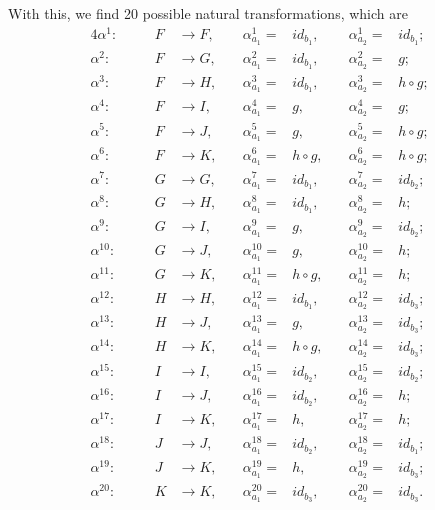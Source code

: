 \documentclass[12pt]{article}
\begin{document}
With this, we find 20 possible natural transformations, which are
\begin{alignat*}{4}
    \alpha^1: &\quad& F&\rightarrow F, \quad& \alpha^1_{a_1}= &id_{b_1}, \quad& \alpha^1_{a_2}= &id_{b_1} ; \\
    \alpha^2: &\quad& F&\rightarrow G, \quad& \alpha^2_{a_1}= &id_{b_1}, \quad& \alpha^2_{a_2}= &g ; \\
    \alpha^3: &\quad& F&\rightarrow H, \quad& \alpha^3_{a_1}= &id_{b_1}, \quad& \alpha^3_{a_2}= &h\circ g ; \\
    \alpha^4: &\quad& F&\rightarrow I, \quad& \alpha^4_{a_1}= &g, \quad& \alpha^4_{a_2}= &g ; \\
    \alpha^5: &\quad& F&\rightarrow J, \quad& \alpha^5_{a_1}= &g, \quad& \alpha^5_{a_2}= &h\circ g ; \\
    \alpha^6: &\quad& F&\rightarrow K, \quad& \alpha^6_{a_1}= &h\circ g, \quad& \alpha^6_{a_2}= &h\circ g ; \\
    \alpha^7: &\quad& G&\rightarrow G, \quad& \alpha^7_{a_1}= &id_{b_1}, \quad& \alpha^7_{a_2}= &id_{b_2} ; \\
    \alpha^8: &\quad& G&\rightarrow H, \quad& \alpha^8_{a_1}= &id_{b_1}, \quad& \alpha^8_{a_2}= &h ; \\
    \alpha^9: &\quad& G&\rightarrow I, \quad& \alpha^9_{a_1}= &g, \quad& \alpha^9_{a_2}= &id_{b_2} ; \\
    \alpha^{10}: &\quad& G&\rightarrow J, \quad& \alpha^{10}_{a_1}= &g, \quad& \alpha^{10}_{a_2}= &h ; \\
    \alpha^{11}: &\quad& G&\rightarrow K, \quad& \alpha^{11}_{a_1}= &h\circ g, \quad& \alpha^{11}_{a_2}= &h ; \\
    \alpha^{12}: &\quad& H&\rightarrow H, \quad& \alpha^{12}_{a_1}= &id_{b_1}, \quad& \alpha^{12}_{a_2}= &id_{b_3} ; \\
    \alpha^{13}: &\quad& H&\rightarrow J, \quad& \alpha^{13}_{a_1}= &g, \quad& \alpha^{13}_{a_2}= &id_{b_3} ; \\
    \alpha^{14}: &\quad& H&\rightarrow K, \quad& \alpha^{14}_{a_1}= &h\circ g, \quad& \alpha^{14}_{a_2}= &id_{b_3} ; \\
    \alpha^{15}: &\quad& I&\rightarrow I, \quad& \alpha^{15}_{a_1}= &id_{b_2}, \quad& \alpha^{15}_{a_2}= &id_{b_2} ; \\
    \alpha^{16}: &\quad& I&\rightarrow J, \quad& \alpha^{16}_{a_1}= &id_{b_2}, \quad& \alpha^{16}_{a_2}= &h ; \\
    \alpha^{17}: &\quad& I&\rightarrow K, \quad& \alpha^{17}_{a_1}= &h, \quad& \alpha^{17}_{a_2}= &h ; \\
    \alpha^{18}: &\quad& J&\rightarrow J, \quad& \alpha^{18}_{a_1}= &id_{b_2}, \quad& \alpha^{18}_{a_2}= &id_{b_1} ; \\
    \alpha^{19}: &\quad& J&\rightarrow K, \quad& \alpha^{19}_{a_1}= &h, \quad& \alpha^{19}_{a_2}= &id_{b_3} ; \\
    \alpha^{20}: &\quad& K&\rightarrow K, \quad& \alpha^{20}_{a_1}= &id_{b_3}, \quad& \alpha^{20}_{a_2}= &id_{b_3}.
\end{alignat*}
\end{document}
